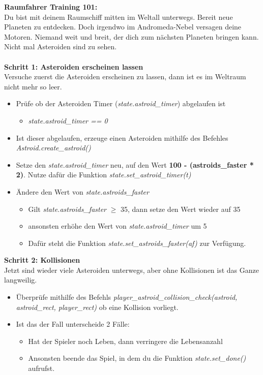 \textbf{\large Raumfahrer Training 101:}\\
Du bist mit deinem Raumschiff mitten im Weltall unterwegs. Bereit neue Planeten zu entdecken. Doch irgendwo im Andromeda-Nebel versagen deine Motoren. Niemand weit und breit, der dich zum nächsten Planeten bringen kann. Nicht mal Asteroiden sind zu sehen.\\\\
\textbf{Schritt 1: Asteroiden erscheinen lassen}\\
Versuche zuerst die Asteroiden erscheinen zu lassen, dann ist es im Weltraum nicht mehr so leer.
\begin{itemize}
	\item Prüfe ob der Asteroiden Timer (\textit{state.astroid\_timer}) abgelaufen ist
	\begin{itemize}
		\item \textit{state.astroid\_timer == 0}
	\end{itemize}
	\item Ist dieser abgelaufen, erzeuge einen Asteroiden mithilfe des Befehles \textit{Astroid.create\_astroid()}
	\item Setze den \textit{state.astroid\_timer} neu, auf den Wert \textbf{100 - (astroids\_faster * 2)}. Nutze dafür die Funktion \textit{state.set\_astroid\_timer(t)}
	\item Ändere den Wert von \textit{state.astroids\_faster}
	\begin{itemize}
		\item Gilt \textit{state.astroids\_faster} $\geq$ 35, dann setze den Wert wieder auf 35
		\item ansonsten erhöhe den Wert von \textit{state.astroid\_timer} um 5
		\item Dafür steht die Funktion \textit{state.set\_astroids\_faster(af)} zur Verfügung.
	\end{itemize}
\end{itemize}
\textbf{Schritt 2: Kollisionen}\\
Jetzt sind wieder viele Asteroiden unterwegs, aber ohne Kollisionen ist das Ganze langweilig.
\begin{itemize}
	\item Überprüfe mithilfe des Befehls \textit{player\_astroid\_collision\_check(astroid, astroid\_rect, player\_rect)} ob eine Kollision vorliegt.
	\item Ist das der Fall unterscheide 2 Fälle:
	\begin{itemize}
		\item Hat der Spieler noch Leben, dann verringere die Lebensanzahl
		\item Ansonsten beende das Spiel, in dem du die Funktion \textit{state.set\_done()} aufrufst.
	\end{itemize}
\end{itemize}

